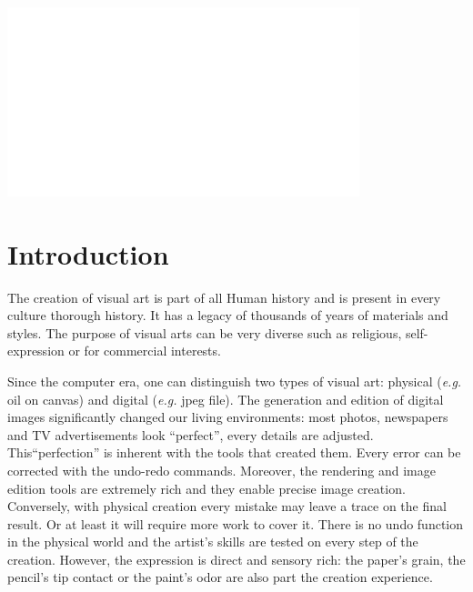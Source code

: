 \documentclass{sigchi}
\begin{document}
\includegraphics[height=55mm]{void.pdf}








\section{Introduction}

The creation of visual art is part of all Human history and is present
in every culture thorough history. It has a legacy of thousands of
years of materials and styles. The purpose of visual arts can be very
diverse such as religious, self-expression or for commercial
interests. 

Since the computer era, one can distinguish two types of visual art:
physical (\textit{e.g.} oil on canvas) and digital 
  (\textit{e.g.} jpeg file). The generation and edition of digital
images significantly changed our living environments: most photos,
newspapers and TV advertisements look ``perfect'', every details are
adjusted.  
This``perfection'' is inherent with the tools that created them. Every
error can be corrected with the undo-redo
commands. Moreover, the rendering and image edition tools
are extremely rich and they enable precise image creation.  
Conversely, with physical creation every mistake may leave a trace on
the final result. Or at least it will require more work to cover
it. There is no undo function in the physical world and the artist's
skills are tested on
every step of the creation. However, the expression is direct and
sensory rich: the paper's grain, the pencil's tip contact or the
paint's odor are also part the creation experience.
\end{document}
